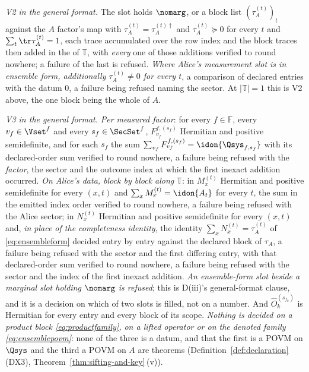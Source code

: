 \begin{definition}
\emph{V2 in the general format.} The slot holds $\nomarg$, or a block list
$(\tau^{(t)}_A)_t$ against the $A$ factor's map with
$\tau^{(t)}_A=\tau^{(t)\dagger}_A$ and $\tau^{(t)}_A\succeq0$ for every $t$
and $\sum_t\tr\tau^{(t)}_A=1$, each trace accumulated over the row index and
the block traces then added in the  of $\mathbb{T}$, with
\emph{every} one of those additions verified to round nowhere; a failure of
the last is refused. \emph{Where Alice's measurement slot is in ensemble form,
additionally $\tau^{(t)}_A\ne0$ for every $t$}, a comparison of declared
entries with the datum $0$, a failure being refused naming the sector. At
$|\mathbb{T}|=1$ this is V2 above, the one block being the whole of $A$.

\emph{V3 in the general format.} \emph{Per measured factor}: for every
$f\in\mathbb{F}$, every $v_f\in\Vset^{f}$ and every $s_f\in\SecSet^{f}$,
$F^{f,(s_f)}_{v_f}$ Hermitian and positive semidefinite, and for each $s_f$
the sum $\sum_{v_f}F^{f,(s_f)}_{v_f}=\idon{\Qsys_{f,s_f}}$ with its
declared-order sum verified to round nowhere, a failure being refused with
the \emph{factor}, the sector and the outcome index at which the first
inexact addition occurred. \emph{On Alice's data, block by block along
$\mathbb{T}$}: in  $M^{(t)}_x$ Hermitian and positive
semidefinite for every $(x,t)$ and $\sum_xM^{(t)}_x=\idon{A_t}$ for every
$t$, the sum in the emitted index order verified to round nowhere, a failure
being refused with the Alice sector; in  $N^{(t)}_x$
Hermitian and positive semidefinite for every $(x,t)$ and, \emph{in place of
the completeness identity}, the identity $\sum_xN^{(t)}_x=\tau^{(t)}_A$ of
\eqref{eq:ensembleform} decided entry by entry against the declared block of
$\tau_A$, a failure being refused with the sector and the first differing
entry, with that declared-order sum verified to round nowhere, a failure
being refused with the sector and the index of the first inexact addition.
\emph{An ensemble-form slot beside a marginal slot holding $\nomarg$ is
refused}; this is D(iii)'s general-format clause, and it is a decision on
which of two slots is filled, not on a number. And $\hat O_k^{(s_{f_k})}$ is
Hermitian for every entry and every block of its scope. \emph{Nothing is
decided on a product block \eqref{eq:productfamily}, on a lifted operator or
on the denoted family \eqref{eq:ensemblepovm}}: none of the three is a datum,
and that the first is a POVM on
$\Qsys$ and the third a POVM on $A$ are theorems
(Definition~\ref{def:declaration}\,(DX3), Theorem~\ref{thm:sifting-and-key}\,(v)).


\end{definition}
